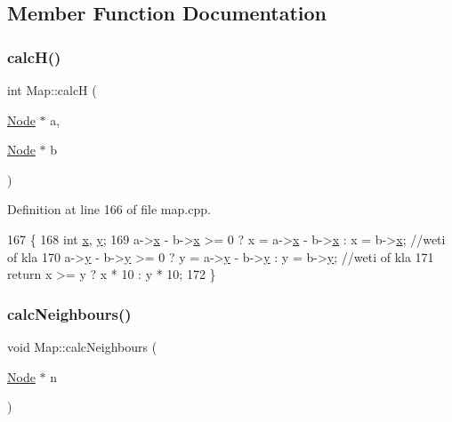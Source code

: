 \subsection{Member Function Documentation}
\mbox{\label{class_map_a0c1055f7616a6779a7f5f1d561a8ccb2}} 
\subsubsection{\texorpdfstring{calc\+H()}{calcH()}}
{\footnotesize\ttfamily int Map\+::calcH (\begin{DoxyParamCaption}\item[{\hyperlink{class_node}{Node} $\ast$}]{a,  }\item[{\hyperlink{class_node}{Node} $\ast$}]{b }\end{DoxyParamCaption})}



Definition at line 166 of file map.\+cpp.


\begin{DoxyCode}
167 \{
168     \textcolor{keywordtype}{int} \hyperlink{class_node_aff1029a518bdc2651007b8856f958364}{x}, \hyperlink{class_node_aa3e5b5240023b4528ae85057b3324202}{y};
169     a->\hyperlink{class_node_aff1029a518bdc2651007b8856f958364}{x} - b->\hyperlink{class_node_aff1029a518bdc2651007b8856f958364}{x} >= 0 ? x = a->\hyperlink{class_node_aff1029a518bdc2651007b8856f958364}{x} - b->\hyperlink{class_node_aff1029a518bdc2651007b8856f958364}{x} : x = b->\hyperlink{class_node_aff1029a518bdc2651007b8856f958364}{x}; \textcolor{comment}{//weti of kla}
170     a->\hyperlink{class_node_aa3e5b5240023b4528ae85057b3324202}{y} - b->\hyperlink{class_node_aa3e5b5240023b4528ae85057b3324202}{y} >= 0 ? y = a->\hyperlink{class_node_aa3e5b5240023b4528ae85057b3324202}{y} - b->\hyperlink{class_node_aa3e5b5240023b4528ae85057b3324202}{y} : y = b->\hyperlink{class_node_aa3e5b5240023b4528ae85057b3324202}{y}; \textcolor{comment}{//weti of kla}
171     \textcolor{keywordflow}{return} x >= y ? x * 10 : y * 10;
172 \}
\end{DoxyCode}
\mbox{\label{class_map_adac9fc32a2c840b40e1417292e846fe2}} 
\subsubsection{\texorpdfstring{calc\+Neighbours()}{calcNeighbours()}}
{\footnotesize\ttfamily void Map\+::calc\+Neighbours (\begin{DoxyParamCaption}\item[{\hyperlink{class_node}{Node} $\ast$}]{n }\end{DoxyParamCaption})}



